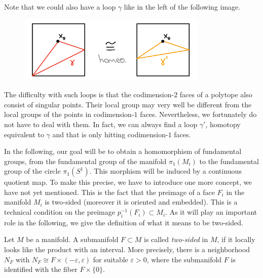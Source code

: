 \begin{remark}
    Note that we could also have a loop \(\gamma\) like in the left of the following image.
    \begin{figure}[h!]
        \label{fig:badray}
        \centering
        \includegraphics[height=3.2cm]{gfx/Equivalent loops.png}
    \end{figure}\vspace*{-\parskip}

    \noindent
    The difficulty with such loops is that the codimension-\(2\) faces of a polytope also consist of singular points.
    Their local group may very well be different from the local groups of the points in codimension-\(1\) faces.
    Nevertheless, we fortunately do not have to deal with them.
    In fact, we can always find a loop \(\gamma'\), homotopy equivalent to \(\gamma\) and that is only hitting codimension-\(1\) faces.
\end{remark}

In the following, our goal will be to obtain a homomorphism of fundamental groups, from the fundamental group of the manifold \(\pi_1(M_i)\) to the fundamental group of the circle \(\pi_1(S^1)\).
This morphism will be induced by a continuous quotient map.
To make this precise, we have to introduce one more concept, we have not yet mentioned.
This is the fact that the preimage of a face \(F_i\) in the manifold \(M_i\) is two-sided (moreover it is oriented and embedded).
This is a technical condition on the preimage \(p_i^{-1}(F_i) \subset M_i\).
As it will play an important role in the following, we give the definition of what it means to be two-sided.

\begin{definition}
    Let \(M\) be a manifold.
    A submanifold \(F \subset M\) is called \emph{two-sided} in \(M\), if it locally looks like the product with an interval.
    More precisely, there is a neighborhood \(N_F\) with \(N_F \cong F \times (-\varepsilon, \varepsilon)\) for suitable \(\varepsilon > 0\), where the submanifold \(F\) is identified with the fiber \(F \times \{0\}\).
\end{definition}

